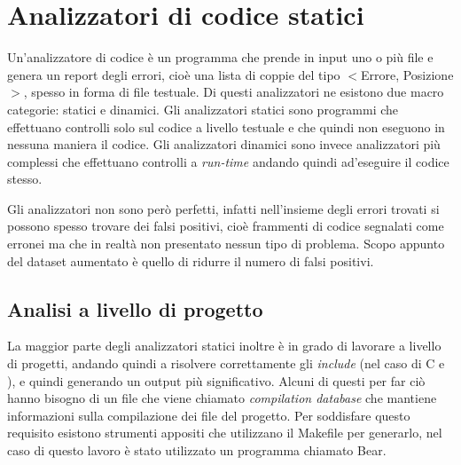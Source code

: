 

 


\section{Analizzatori di codice statici}
Un'analizzatore di codice è un programma che prende in input uno o più file e genera un report degli errori, cioè una lista di coppie del tipo $<$Errore, Posizione$>$, spesso in forma di file testuale. Di questi analizzatori ne esistono due macro categorie: statici e dinamici. 
Gli analizzatori statici sono programmi che effettuano controlli solo sul codice a livello testuale e che quindi non eseguono in nessuna maniera il codice. Gli analizzatori dinamici sono invece analizzatori più complessi che effettuano controlli a \textit{run-time}
andando quindi ad'eseguire il codice stesso.

Gli analizzatori non sono però perfetti, infatti nell'insieme degli errori trovati si possono spesso trovare dei falsi positivi, cioè frammenti di codice segnalati come erronei ma che in realtà non presentato nessun tipo di problema. Scopo appunto del dataset aumentato
è quello di ridurre il numero di falsi positivi.


\subsection{Analisi a livello di progetto} \label{subsec:compile_database}
La maggior parte degli analizzatori statici inoltre è in grado di lavorare a livello di progetti, andando quindi a risolvere correttamente gli \textit{include} (nel caso di C e \CPP), e quindi generando un output più significativo. 
Alcuni di questi per far ciò hanno bisogno di un file che viene chiamato \textit{compilation database} che mantiene informazioni sulla compilazione dei file del progetto. 
Per soddisfare questo requisito esistono strumenti appositi che utilizzano il Makefile per generarlo, nel caso di questo lavoro è stato utilizzato un programma chiamato Bear.


